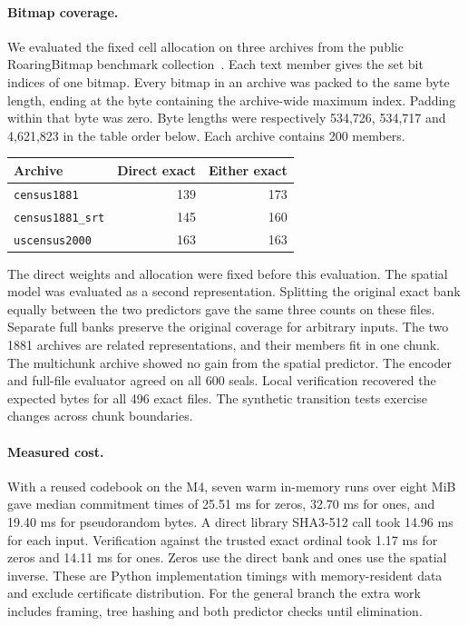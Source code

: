 \documentclass[10pt,twocolumn,letterpaper]{article}
\begin{document}
\paragraph{Bitmap coverage.}
We evaluated the fixed cell allocation on three archives from the public RoaringBitmap benchmark collection~\cite{roaring}. Each text member gives the set bit indices of one bitmap. Every bitmap in an archive was packed to the same byte length, ending at the byte containing the archive-wide maximum index. Padding within that byte was zero. Byte lengths were respectively 534,726, 534,717 and 4,621,823 in the table order below. Each archive contains 200 members.
\begin{center}\small
\begin{tabular}{@{}lrr@{}}
\toprule
Archive & Direct exact & Either exact\\
\midrule
\texttt{census1881} & 139 & 173\\
\texttt{census1881\_srt} & 145 & 160\\
\texttt{uscensus2000} & 163 & 163\\
\bottomrule
\end{tabular}
\end{center}
The direct weights and allocation were fixed before this evaluation. The spatial model was evaluated as a second representation. Splitting the original exact bank equally between the two predictors gave the same three counts on these files. Separate full banks preserve the original coverage for arbitrary inputs. The two 1881 archives are related representations, and their members fit in one chunk. The multichunk archive showed no gain from the spatial predictor. The encoder and full-file evaluator agreed on all 600 seals. Local verification recovered the expected bytes for all 496 exact files. The synthetic transition tests exercise changes across chunk boundaries.

\paragraph{Measured cost.}
With a reused codebook on the M4, seven warm in-memory runs over eight MiB gave median commitment times of 25.51 ms for zeros, 32.70 ms for ones, and 19.40 ms for pseudorandom bytes. A direct library SHA3-512 call took 14.96 ms for each input. Verification against the trusted exact ordinal took 1.17 ms for zeros and 14.11 ms for ones. Zeros use the direct bank and ones use the spatial inverse. These are Python implementation timings with memory-resident data and exclude certificate distribution. For the general branch the extra work includes framing, tree hashing and both predictor checks until elimination.
\end{document}
